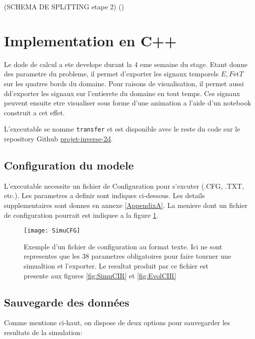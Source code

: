 (SCHEMA DE SPLiTTING etape 2) (\parencite{Reference4})


\section{Implementation en C++}

Le dode de calcul a ete develope durant la 4 eme semaine du stage. Etant donne des parametre du probleme, il permet d'exporter les signaux temporels $E, F \text{et} T$ sur les quatres bords du domaine. Pour raisons de visualisation, il permet aussi dd'exporter les signaux sur l'entierete du domaine en tout temps. Ces signaux peuvent ensuite etre visualiser sous forme d'une animation a l'aide d'un notebook construit a cet effet.

L'executable se nomme \verb|transfer| et est disponible avec le reste du code sur le repository Github \href{https://github.com/desmond-rn/projet-inverse-2d}{projet-inverse-2d}.

\subsection{Configuration du modele}

L'executable necessite un fichier de Configuration pour s'excuter (.CFG, .TXT, etc.). Les parametres a definir sont indiques ci-dessous. Les details supplementaires sont donnes en annexe \ref{AppendixA}. La meniere dont un fichier de configuration pourrait est indiquee a la figure \ref{fig:SimuCFG}.

\begin{figure}[!h]
\centering
\texttt{[image: SimuCFG]} 
\decoRule
\caption[SimuCFG]{Exemple d'un fichier de configuration au format texte. Ici ne sont representes que les 38 parametres obligatoires pour faire tourner une simualtion et l'exporter. Le resultat produit par ce fichier est presente aux figures \ref{fig:SimuCIR} et \ref{fig:EvolCIR}}
\label{fig:SimuCFG}
\end{figure}


\subsection{Sauvegarde des données}

Comme mentione ci-haut, on dispose de deux options pour sauvegarder les resultats de la simulation:

